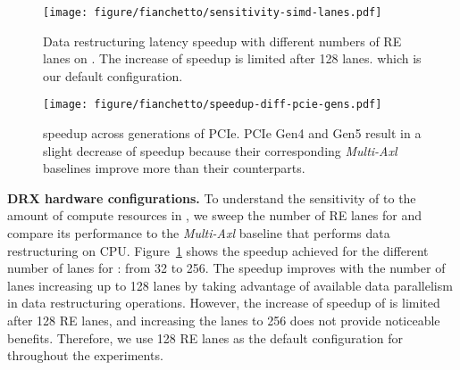 
\begin{figure}[t!]
    \centering
    \texttt{[image: figure/fianchetto/sensitivity-simd-lanes.pdf]}
    \caption{Data restructuring latency speedup with different numbers of RE lanes on \drx. The increase of speedup
    is limited after 128 lanes. which is our default configuration.}
    \label{fig:res:simd-lanes}
\end{figure}

\begin{figure}[t!]
    \centering
    \texttt{[image: figure/fianchetto/speedup-diff-pcie-gens.pdf]}
    \caption{\dmx speedup across generations of PCIe. PCIe Gen4 and Gen5 result in a slight decrease of speedup because their corresponding \emph{Multi-Axl} baselines improve more than their \dmx counterparts.}
    \label{fig:res:pcie-gens}
\end{figure}


\noindent \textbf{DRX hardware configurations.}
\label{sec:results:hardware-config}
%
To understand the sensitivity of \dmx to the amount of compute resources in \drx, we sweep the number of RE lanes for \drx and compare its performance to the \emph{Multi-Axl} baseline that performs data restructuring on CPU. 
%
Figure~\ref{fig:res:simd-lanes} shows the speedup achieved for the different number of lanes for \drx: from 32 to 256. 
%
The speedup improves with the number of lanes increasing up to 128 lanes by taking advantage of available data parallelism in data restructuring operations.
%
%
However, the increase of speedup of \drx is limited after 128 RE lanes, and increasing the lanes to 256 does not provide noticeable benefits.
%
Therefore, we use 128 RE lanes as the default configuration for \drx throughout the experiments. 


